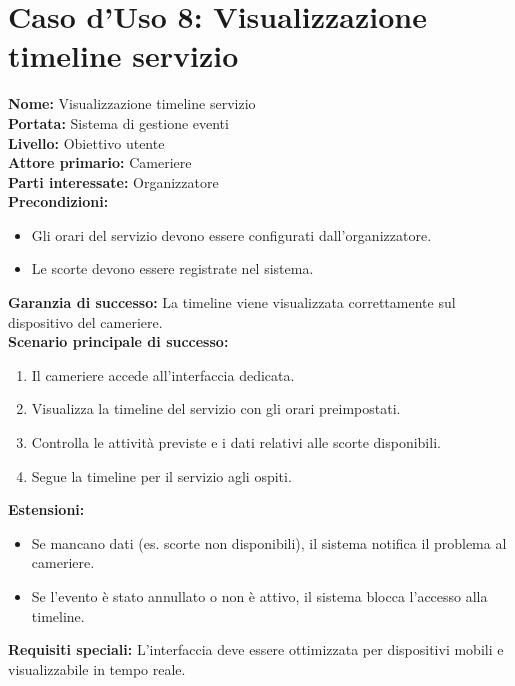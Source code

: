 \documentclass[a4paper,12pt]{article}
\begin{document}
\section*{\textcolor{sectioncolor}{Caso d'Uso 8: Visualizzazione timeline servizio}}
\textcolor{textcolor}{
\textbf{Nome:} Visualizzazione timeline servizio\\
\textbf{Portata:} Sistema di gestione eventi\\
\textbf{Livello:} Obiettivo utente\\
\textbf{Attore primario:} Cameriere\\
\textbf{Parti interessate:} Organizzatore\\
\textbf{Precondizioni:}
\begin{itemize}
    \item Gli orari del servizio devono essere configurati dall'organizzatore.
    \item Le scorte devono essere registrate nel sistema.
\end{itemize}
\textbf{Garanzia di successo:} La timeline viene visualizzata correttamente sul dispositivo del cameriere.\\
\textbf{Scenario principale di successo:}
\begin{enumerate}
    \item Il cameriere accede all'interfaccia dedicata.
    \item Visualizza la timeline del servizio con gli orari preimpostati.
    \item Controlla le attività previste e i dati relativi alle scorte disponibili.
    \item Segue la timeline per il servizio agli ospiti.
\end{enumerate}
\textbf{Estensioni:}
\begin{itemize}
    \item  Se mancano dati (es. scorte non disponibili), il sistema notifica il problema al cameriere.
    \item  Se l'evento è stato annullato o non è attivo, il sistema blocca l'accesso alla timeline.
\end{itemize}
\textbf{Requisiti speciali:} L'interfaccia deve essere ottimizzata per dispositivi mobili e visualizzabile in tempo reale.
}
\end{document}
